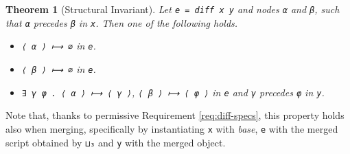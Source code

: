\documentclass{sigplanconf}
\theoremstyle{plain}
\newtheorem{thm}{Theorem}
\begin{document}
%
\begin{thm}[Structural Invariant]
Let \texttt{e = diff x y} and nodes \texttt{α} and \texttt{β},
such that \texttt{α} precedes \texttt{β} in \texttt{x}.
Then one of the following holds.
\begin{itemize}
\item \texttt{⟨ α ⟩ ⟼ ∅} in \texttt{e}. %
\item \texttt{⟨ β ⟩ ⟼ ∅} in \texttt{e}. %
\item \texttt{∃ γ φ . ⟨ α ⟩ ⟼ ⟨ γ ⟩}, \texttt{⟨ β ⟩ ⟼ ⟨ φ ⟩} in
  \texttt{e} and \texttt{γ} precedes \texttt{φ} in \texttt{y}.
\end{itemize}
\end{thm}

Note that, thanks to permissive Requirement \ref{req:diff-specs},
this property holds also when merging, specifically by instantiating
\texttt{x} with \emph{base}, \texttt{e} with the merged script
obtained by \texttt{⊔₃} and \texttt{y} with the merged object.

\end{document}
